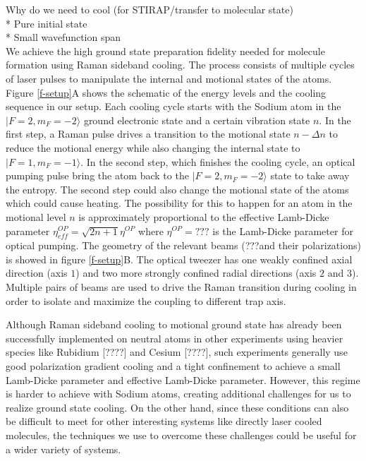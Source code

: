 \documentclass[aps,prl,twocolumn,groupedaddress]{revtex4-1}
\begin{document}
Why do we need to cool (for STIRAP/transfer to molecular state)\\

* Pure initial state\\
* Small wavefunction span\\

We achieve the high ground state preparation fidelity needed for molecule formation
using Raman sideband cooling. The process consists of multiple cycles of laser pulses
to manipulate the internal and motional states of the atoms.
Figure \ref{f-setup}A shows the schematic of the energy levels and the cooling sequence
in our setup.
Each cooling cycle starts with the Sodium atom in the $|F=2, m_F=-2\rangle$
ground electronic state and a certain vibration state $n$.
In the first step, a Raman pulse drives a transition to the motional state $n-\Delta n$
to reduce the motional energy while also changing the internal state to $|F=1, m_F=-1\rangle$.
In the second step, which finishes the cooling cycle,
an optical pumping pulse bring the atom back to the $|F=2, m_F=-2\rangle$ state to take away
the entropy. The second step could also change the motional state of the atoms which
could cause heating. The possibility for this to happen for an atom in the motional level $n$
is approximately proportional to the effective Lamb-Dicke parameter
$\eta^{OP}_{eff}=\sqrt{2n+1}\eta^{OP}$ where $\eta^{OP}=???$ is the Lamb-Dicke parameter for
optical pumping.
The geometry of the relevant beams (???and their polarizations) is showed in figure \ref{f-setup}B.
The optical tweezer has one weakly confined axial direction (axis $1$) and
two more strongly confined radial directions (axis $2$ and $3$).
Multiple pairs of beams are used to drive the Raman transition during cooling in order to
isolate and maximize the coupling to different trap axis.

Although Raman sideband cooling to motional ground state has already been successfully
implemented on neutral atoms in other experiments using heavier species like Rubidium [????]
and Cesium [????], such experiments generally use good polarization gradient cooling
and a tight confinement to achieve a small Lamb-Dicke parameter and effective Lamb-Dicke parameter.
However, this regime is harder to achieve with Sodium atoms, creating additional challenges for
us to realize ground state cooling. On the other hand, since these conditions can also be difficult
to meet for other interesting systems like directly laser cooled molecules, the techniques we
use to overcome these challenges could be useful for a wider variety of systems.
\end{document}
